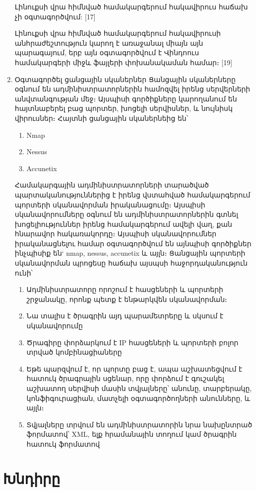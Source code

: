 \documentclass[10pt]{article}
\begin{document}
\begin{sloppypar}
\begin{enumerate}
	Լինուքսի վրա հիմնված համակարգերում հակավիրուս հաճախ չի օգտագործվում: [17]

	Լինուքսի վրա հիմնված համակարգերում հակավիրուսի անհրաժեշտություն կարող է
	առաջանալ միայն այն պարագայում, երբ այն օգտագործվում է Վինդոուս համակարգերի
	միջև ֆայլերի փոխանակաման համար։ [19]
\item Օգտագործել ցանցային սկաներներ
    Ցանցային սկաներները օգնում են ադմինիստրատորներին համոզվել իրենց
    սերվերների անվտանգության մեջ։ Այսպիսի գործիքները կարողանում են
    հայտնաբերել բաց պորտեր, խոցելի սերվիսներ, և նույնիսկ վիրուսներ։
    Հայտնի ցանցային սկաներնեից են՝
    \begin{enumerate}
        \item Nmap
        \item Nessus
        \item Accunetix
    \end{enumerate}
	Համակարգային ադմինիստրատորների տարածված պարտականություններից է իրենց
	վստահված համակարգերում պորտերի սկանավորման իրականացումը։
	Այսպիսի սկանավորումները օգնում են ադմինիստրատորներին գտնել խոցելիություններ
	իրենց համակարգերում ավելի վաղ, քան հնարավոր հակառակորդը։
	Այսպիսի սկանավորումներ իրականացնելու համար օգտագործվում են այնպիսի
	գործիքներ ինչպիսիք են` nmap, nessus, accunetix և այլն։
	Ցանցային պորտերի սկանավորման պրոցեսը հաճախ այսպսի հաջորդականություն ունի՝

	\begin{enumerate}
	\item Ադմինիստրատորը որոշում է հասցեների և պորտերի շրջանակը, որոնք պետք է
		ենթարկվեն սկանավորման։
	\item Նա տալիս է ծրագրին այդ պարամետրերը և սկսում է սկանավորումը
	\item Ծրագիրը փորձարկում է IP հասցեների և պորտերի բոլոր տրված
		կոմբինացիաները
	\item Եթե պարզվում է, որ պորտը բաց է, ապա աշխատեցվում է հատուկ ծրագրային
		սցենար, որը փորձում է գուշակել աշխատող սերվիսի մասին տվյալները՝
		անունը, տարբերակը, կոնֆիգուրացիան, մատչելի օգտագործողների անունները,
		և այլն։
	\item Տվյալները տրվում են ադմինիստրատորին նրա նախընտրած ֆորմատով՝
		XML, ելք հրամանային տողում կամ ծրագրին հատուկ ֆորմատով
	\end{enumerate}
\end{enumerate}


\section{Խնդիրը}



\end{sloppypar}
\end{document}
